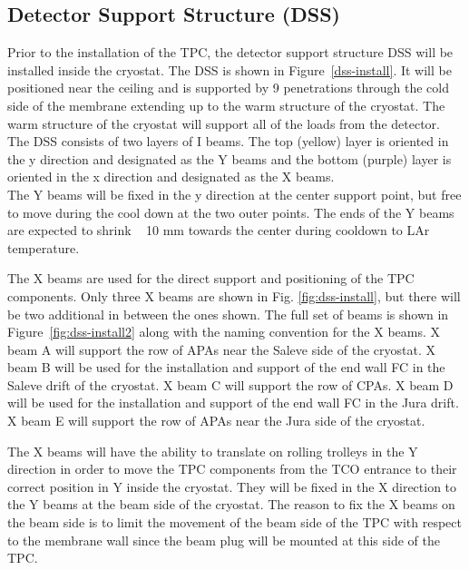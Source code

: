 \subsection{Detector Support Structure (DSS)}


Prior to the installation of the TPC, the detector support structure DSS will be installed inside the cryostat.  The DSS is shown in Figure~\ref{dss-install}.  It will be positioned near the ceiling and is supported by 9 penetrations through the cold side of the membrane extending up to the warm structure of the cryostat.  The warm structure of the cryostat will support all of the loads from the detector.  The DSS consists of two layers of I beams.  The top (yellow) layer is oriented in the y direction and designated as the Y beams and the bottom (purple) layer is oriented in the x direction and designated as the X beams. \\
The Y beams will be fixed in the y direction at the center support point, but free to move during the cool down at the two outer points.  The ends of the Y beams are expected to shrink ~ 10 mm towards the center during cooldown to LAr temperature.  

The X beams are used for the direct support and positioning of the TPC components.  Only three X beams are shown in Fig. \ref{fig:dss-install}, but there will be two additional in between the ones shown.  
The full set of beams is shown in Figure~\ref{fig:dss-install2} along with the naming convention for the X beams.
 X beam A will support the row of APAs near the Saleve side of the cryostat.  X beam B will be used for the installation and support of the end wall FC in the Saleve drift of the cryostat.  X beam C will support the row of CPAs.  X beam D will be used for the installation and support of the end wall FC in the Jura drift.  X beam E will support the row of APAs near the Jura side of the cryostat.  

The X beams will have the ability to translate on rolling trolleys in the Y direction in order to move the TPC components from the TCO entrance to their correct position in Y inside the cryostat.  They will be fixed in the X direction to the Y beams at the beam side of the cryostat.  The reason 
to fix the X beams on the beam side is to limit the movement of the beam side of the TPC with respect to the membrane wall since
the beam plug will be mounted at this side of the TPC.  

